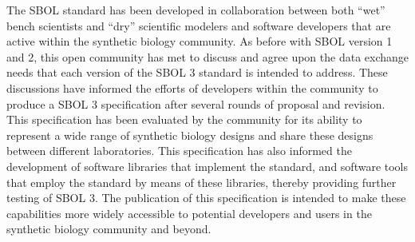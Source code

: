 


The SBOL standard has been developed in collaboration between both ``wet'' bench scientists and ``dry'' scientific modelers and software developers that are active within the synthetic biology community. 
As before with SBOL version 1 and 2, this open community has met to discuss and agree upon the data exchange needs that each version of the SBOL 3 standard is intended to address. 
These discussions have informed the efforts of  developers within the community to produce a SBOL 3 specification after several rounds of proposal and revision. This specification has been evaluated by the community for its ability to represent a wide range of synthetic biology designs and share these designs between different laboratories. 
This specification has also informed the development of software libraries that implement the standard, and software tools that employ the standard by means of these libraries, thereby providing further testing of SBOL 3. 
The publication of this specification is intended to make these capabilities more widely accessible to potential developers and users in the synthetic biology community and beyond.
